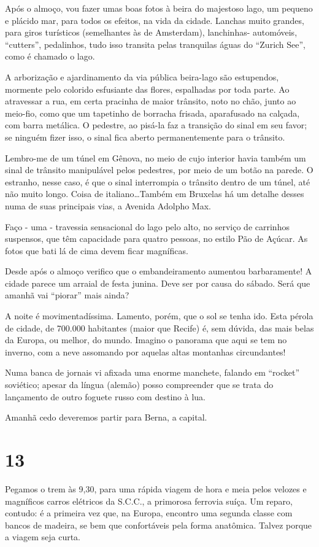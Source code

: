 Após o almoço, vou fazer umas boas fotos à beira do majestoso lago, um pequeno e plácido mar, para todos os efeitos, na vida da cidade. Lanchas muito grandes, para giros turísticos (semelhantes às de Amsterdam), lanchinhas- automóveis, ``cutters'', pedalinhos, tudo isso transita pelas tranquilas águas do ``Zurich See'', como é chamado o lago.

A arborização e ajardinamento da via pública beira-lago são estupendos, mormente pelo colorido esfusiante das flores, espalhadas por toda parte. Ao atravessar a rua, em certa pracinha de maior trânsito, noto no chão, junto ao meio-fio, como que um tapetinho de borracha frisada, aparafusado na calçada, com barra metálica. O pedestre, ao pisá-la faz a transição do sinal em seu favor; se ninguém fizer isso, o sinal fica aberto permanentemente para o trânsito.

Lembro-me de um túnel em Gênova, no meio de cujo interior havia também um sinal de trânsito manipulável pelos pedestres, por meio de um botão na parede. O estranho, nesse caso, é que o sinal interrompia o trânsito dentro de um túnel, até não muito longo. Coisa de italiano\ldots Também em Bruxelas há um detalhe desses numa de suas principais vias, a Avenida Adolpho Max.

Faço - uma - travessia sensacional do lago pelo alto, no serviço de carrinhos suspensos, que têm capacidade para quatro pessoas, no estilo Pão de Açúcar. As fotos que bati lá de cima devem ficar magníficas.

Desde após o almoço verifico que o embandeiramento aumentou barbaramente! A cidade parece um arraial de festa junina. Deve ser por causa do sábado. Será que amanhã vai ``piorar'' mais ainda?

A noite é movimentadíssima. Lamento, porém, que o sol se tenha ido. Esta pérola de cidade, de 700.000 habitantes (maior que Recife) é, sem dúvida, das mais belas da Europa, ou melhor, do mundo. Imagino o panorama que aqui se tem no inverno, com a neve assomando por aquelas altas montanhas circundantes!

Numa banca de jornais vi afixada uma enorme manchete, falando em ``rocket'' soviético; apesar da língua (alemão) posso compreender que se trata do lançamento de outro foguete russo com destino à lua.

Amanhã cedo deveremos partir para Berna, a capital.

\section*{13 \adfflatleafright {}}
Pegamos o trem às 9,30, para uma rápida viagem de hora e meia pelos velozes e magníficos carros elétricos da S.C.C., a primorosa ferrovia suíça. Um reparo, contudo: é a primeira vez que, na Europa, encontro uma segunda classe com bancos de madeira, se bem que confortáveis pela forma anatômica. Talvez porque a viagem seja curta.

